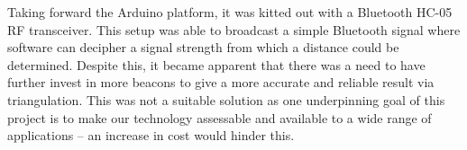 Taking forward the Arduino platform, it was kitted out with a Bluetooth HC-05 RF transceiver. This setup was able to broadcast a simple Bluetooth signal where software can decipher a signal strength from which a distance could be determined. Despite this, it became apparent that there was a need to have further invest in more beacons to give a more accurate and reliable result via triangulation. This was not a suitable solution as one underpinning goal of this project is to make our technology assessable and available to a wide range of applications – an increase in cost would hinder this.